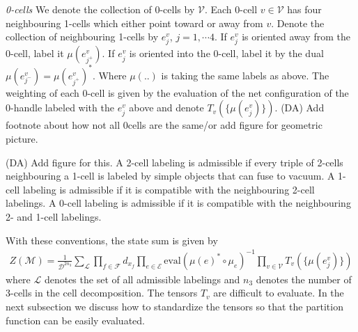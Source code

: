 \documentclass[12pt,a4paper]{article}
\newcommand{\mce}{\mathcal{E}}
\newcommand{\mcd}{\mathcal{D}}
\newcommand{\mcl}{\mathcal{L}}
\newcommand{\mcm}{\mathcal{M}}
\newcommand{\mcv}{\mathcal{V}}
\newcommand{\mcf}{\mathcal{F}}
\newcommand{\dave}[1]{{\color{ao(english)}\footnotesize{(DA) #1}}}
\begin{document}
{\it 0-cells}
We denote the collection of 0-cells by $\mcv$. 
Each 0-cell $v \in \mcv$ has four neighbouring 1-cells which either point toward or away from $v$. 
Denote the collection of neighbouring 1-cells by $e^v_j$, $j =1, \cdots 4$. 
If $e^v_j$ is oriented away from the 0-cell, 
label it $\mu(e^v_{j^+})$.
If $e_j^v$ is oriented into the 0-cell, 
label it by the dual $\mu(e^v_{j^-}) = \mu(e^v_{j^+})^*$.
Where $\mu(..)$ is taking the same labels as above.
The weighting of each 0-cell is given by the evaluation of the net configuration 
of the 0-handle labeled with the $e_j^v$ above and denote $T_v( \{ \mu(e^v_j) \})$.
\dave{Add footnote about how not all 0cells are the same/or add figure for geometric picture.}

\dave{Add figure for this.}
A 2-cell labeling is admissible if every triple of 2-cells neighbouring a 1-cell is labeled by simple objects that can fuse to vacuum. 
A 1-cell labeling is admissible if it is compatible with the neighbouring 2-cell labelings.
A 0-cell labeling is admissible if it is compatible with the neighbouring 2- and 1-cell labelings.

With these conventions, the state sum is given by
\begin{align}
Z(\mcm) = \frac{1}{\mcd^{2n_3}}\sum_{ \mcl } \prod_{f \in \mcf} d_{x_f}  \prod_{e \in \mce} \text{eval}(\mu(e)^*\circ \mu_e)^{-1} \prod_{v \in \mcv} T_v(\{ \mu(e_j^v) \})
\label{state_sum}
\end{align}
where $\mcl$ denotes the set of all admissible labelings and $n_3$ denotes the number of 3-cells in the cell decomposition. 
The tensors $T_v$ are difficult to evaluate. 
In the next subsection we discuss how to standardize the tensors so that the partition function can be easily evaluated. 
\end{document}
